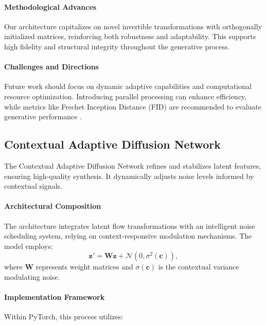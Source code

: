 \paragraph{Methodological Advances}

Our architecture capitalizes on novel invertible transformations with orthogonally initialized matrices, reinforcing both robustness and adaptability. This supports high fidelity and structural integrity throughout the generative process.

\paragraph{Challenges and Directions}

Future work should focus on dynamic adaptive capabilities and computational resource optimization. Introducing parallel processing can enhance efficiency, while metrics like Frechet Inception Distance (FID) are recommended to evaluate generative performance \cite{heusel2017gans}.

\subsection{Contextual Adaptive Diffusion Network}

The Contextual Adaptive Diffusion Network refines and stabilizes latent features, ensuring high-quality synthesis. It dynamically adjusts noise levels informed by contextual signals.

\paragraph{Architectural Composition}

The architecture integrates latent flow transformations with an intelligent noise scheduling system, relying on context-responsive modulation mechanisms. The model employs:
\begin{equation}
\mathbf{z}' = \mathbf{W} \mathbf{z} + \mathcal{N}(0, \sigma^2(\mathbf{c})),
\end{equation}
where \(\mathbf{W}\) represents weight matrices and \(\sigma(\mathbf{c})\) is the contextual variance modulating noise.

\paragraph{Implementation Framework}

Within PyTorch, this process utilizes:

